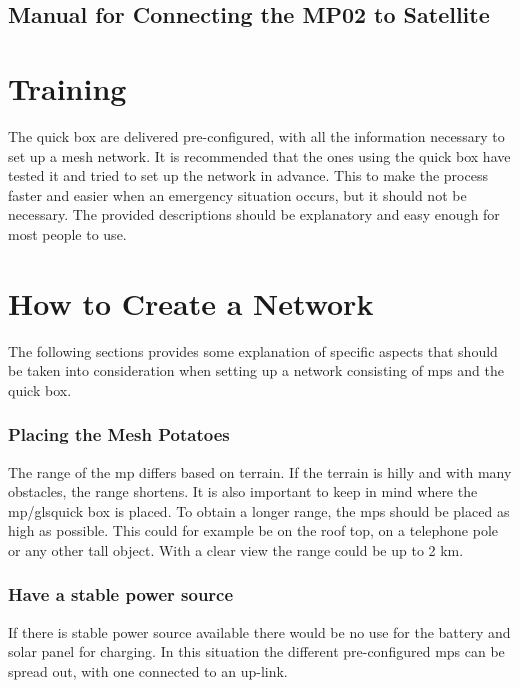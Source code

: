 
\clearpage

 
\clearpage
\subsection{Manual for Connecting the MP02 to Satellite}

\clearpage
\section{Training}
The \gls{quick} box are delivered pre-configured, with all the  information necessary to set up a mesh network. It is recommended that the ones using the \gls{quick} box have tested it and tried to set up the network in advance. This to make the process faster and easier when an emergency situation occurs, but it should not be necessary. The provided descriptions should be explanatory and easy enough for most people to use.


\section{How to Create a Network}
The following sections provides some explanation of specific aspects that should be taken into consideration when setting up a network consisting of \glspl{mp} and the \gls{quick} box. 

\subsubsection{Placing the Mesh Potatoes}
The range of the \gls{mp} differs based on terrain. If the terrain is hilly and with many obstacles, the range shortens. It is also important to keep in mind where the \gls{mp}/gls{quick} box is placed. To obtain a longer range, the \glspl{mp} should be placed as high as possible. This could for example be on the roof top, on a telephone pole or any other tall object. With a clear view the range could be up to 2 km. 

\subsubsection{Have a stable power source}
If there is stable power source available there would be no use for the battery and solar panel for charging. In this situation the different pre-configured \glspl{mp} can be spread out, with one connected to an up-link. 

